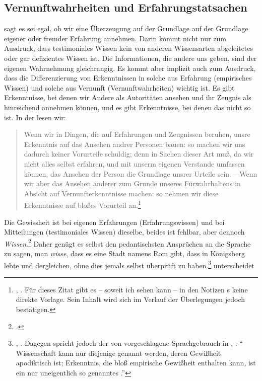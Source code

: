 \subsection{Vernunftwahrheiten und
Erfahrungstatsachen}\label{subsection:VernunftwahrheitenUndErfahrungstatsachen}
 sagt es sei egal, ob wir eine Überzeugung auf der
Grundlage auf der Grundlage eigener oder fremder Erfahrung annehmen. Darin kommt
nicht nur zum Ausdruck, dass testimoniales Wissen kein von anderen Wissensarten
abgeleitetes oder gar defizientes Wissen ist. Die Informationen, die andere uns
geben, sind der eigenen Wahrnehmung gleichrangig. Es kommt aber implizit auch
zum Ausdruck, dass die Differenzierung von Erkenntnissen in
solche aus Erfahrung (empirisches Wissen) und solche aus Vernunft
(Vernunftwahrheiten) wichtig ist. Es gibt Erkenntnisse, bei denen wir Andere als
Autoritäten ansehen und ihr Zeugnis als hinreichend annehmen können, und es gibt
Erkenntnisse, bei denen das nicht so ist. In der {\jaeschelogik} lesen wir:
\begin{quote}\label{Zitat:Kant:TestimonialesWissenVernunftErfahrung}
Wenn wir in Dingen, die auf Erfahrungen und Zeugnissen beruhen, unsre
Erkenntnis auf das Ansehen andrer Personen bauen: so machen wir uns dadurch
keiner Vorurteile schuldig; denn in Sachen dieser Art muß, da wir nicht alles
selbst erfahren, und mit unserm eigenen Verstande umfassen können, das Ansehen
der Person die Grundlage unsrer Urteile sein. -- Wenn wir aber das Ansehen
anderer zum Grunde unseres Fürwahrhaltens in Absicht auf Vernunfterkenntnisse
machen: so nehmen wir diese Erkenntnisse auf bloßes Vorurteil
an.\footnote{\cite[][A~120]{Kant:ImmanuelKantsLogik1977}, \cite[][IX:
77.31--78.5]{Kant:GesammelteWerke1900ff.}. Für dieses Zitat gibt es -- soweit
ich sehen kann -- in den Notizen s keine direkte Vorlage.
Sein Inhalt wird sich im Verlauf der Überlegungen jedoch bestätigen.}
\end{quote}
Die Gewissheit ist bei eigenen Erfahrungen (Erfahrungswissen) und bei
Mitteilungen (testimoniales Wissen) dieselbe, beides ist fehlbar, aber dennoch
\emph{Wissen}.\footnote{\cite[Vgl.][A~111,
Anm.]{Kant:ImmanuelKantsLogik1977}\protect{,} \cite[][IX:
72.24]{Kant:GesammelteWerke1900ff.}.} Daher genügt es selbst den pedantischsten
Ansprüchen an die Sprache zu sagen, man \emph{wisse}, dass es eine Stadt
namens Rom gibt, dass  in Königsberg lebte und dergleichen, ohne dies
jemals selbst überprüft zu
haben.\footnote{\cite[Vgl.][A~319]{Kant:Washeisst:SichimDenkenorientieren?1977},
\cite[][VIII:
141.13--17]{Kant:GesammelteWerke1900ff.}. Dagegen spricht jedoch der von
 vorgeschlagene Sprachgebrauch in
\cite[][A~v]{Kant:MetaphysischeAnfangsgruendederNaturwissenschaften1977},
\cite[][IV:
468.17--19]{Kant:GesammelteWerke1900ff.}:
\enquote{ Wissenschaft kann nur diejenige genannt werden, deren
Gewißheit apodiktisch ist; Erkenntnis, die bloß empirische Gewißheit enthalten
kann, ist ein nur uneigentlich so genanntes .}}  unterscheidet
